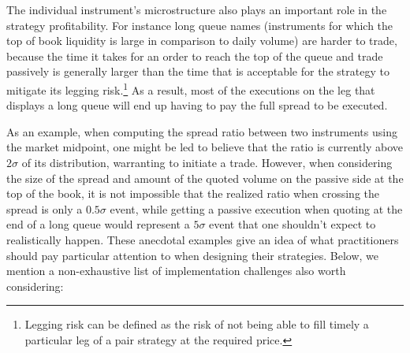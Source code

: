 The individual instrument's microstructure also plays an important role in the strategy profitability. For instance long queue names  (instruments for which the top of book liquidity is large in comparison to daily volume)  are harder to trade, because the time it takes for an order to reach the top of the queue and trade passively is generally larger than the time that is acceptable for the strategy to mitigate its legging risk.\footnote{Legging risk can be defined as the risk of not being able to fill timely a particular leg of a pair strategy at the required price.} As a result, most of the executions on the leg that displays a long queue will end up having to pay the full spread to be executed. 


As an example, when computing the spread ratio between two instruments using the market midpoint, one might be led to believe that the ratio is currently above $2\sigma$ of its distribution, warranting to initiate a trade. However, when considering the size of the spread and amount of the quoted volume on the passive side at the top of the book, it is not impossible that the realized ratio when crossing the spread is only a $0.5\sigma$ event, while getting a passive execution when quoting at the end of a long queue would represent a $5\sigma$ event that one shouldn't expect to realistically happen. These anecdotal examples give an idea of what practitioners should pay particular attention to when designing their strategies. Below, we mention a non-exhaustive list of implementation challenges also worth considering:


